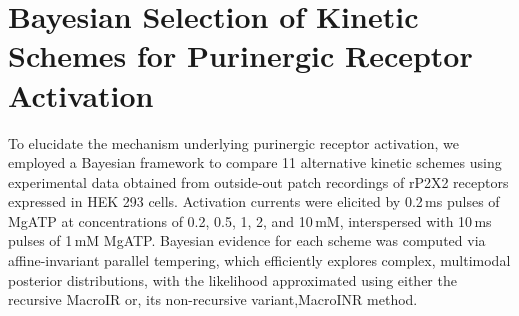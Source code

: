 \documentclass[pdflatex,sn-mathphys-num]{sn-jnl}%
\theoremstyle{thmstyleone}%
\theoremstyle{thmstyletwo}%
\theoremstyle{thmstylethree}%
\begin{document}

\section{Bayesian Selection of Kinetic Schemes for Purinergic Receptor Activation}

To elucidate the mechanism underlying purinergic receptor activation, we employed a Bayesian framework to compare 11 alternative kinetic schemes using experimental data obtained from outside‐out patch recordings of rP2X2 receptors expressed in HEK 293 cells. Activation currents were elicited by 0.2\,ms pulses of MgATP at concentrations of 0.2, 0.5, 1, 2, and 10\,mM, interspersed with 10\,ms pulses of 1\,mM MgATP. Bayesian evidence for each scheme was computed via affine-invariant parallel tempering, which efficiently explores complex, multimodal posterior distributions, with the likelihood approximated using either the recursive MacroIR or, its  non-recursive variant,MacroINR method.
\end{document}

